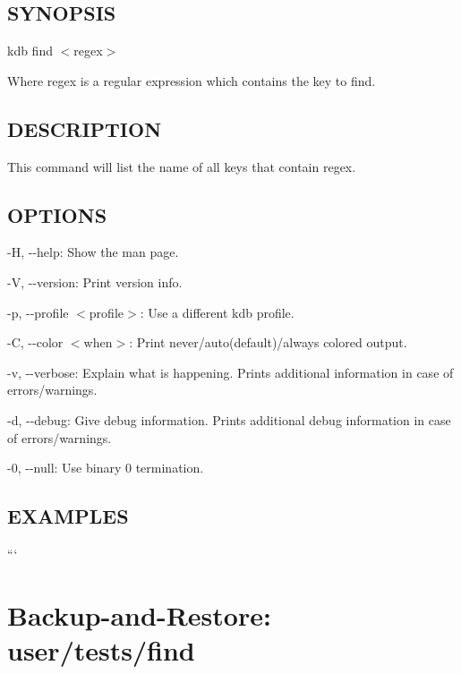 \subsection*{S\+Y\+N\+O\+P\+S\+IS}

{\ttfamily kdb find $<$regex$>$}

Where {\ttfamily regex} is a regular expression which contains the key to find.

\subsection*{D\+E\+S\+C\+R\+I\+P\+T\+I\+ON}

This command will list the name of all keys that contain {\ttfamily regex}.

\subsection*{O\+P\+T\+I\+O\+NS}


\begin{DoxyItemize}
\item {\ttfamily -\/H}, {\ttfamily -\/-\/help}\+: Show the man page.
\item {\ttfamily -\/V}, {\ttfamily -\/-\/version}\+: Print version info.
\item {\ttfamily -\/p}, {\ttfamily -\/-\/profile $<$profile$>$}\+: Use a different kdb profile.
\item {\ttfamily -\/C}, {\ttfamily -\/-\/color $<$when$>$}\+: Print never/auto(default)/always colored output.
\item {\ttfamily -\/v}, {\ttfamily -\/-\/verbose}\+: Explain what is happening. Prints additional information in case of errors/warnings.
\item {\ttfamily -\/d}, {\ttfamily -\/-\/debug}\+: Give debug information. Prints additional debug information in case of errors/warnings.
\item {\ttfamily -\/0}, {\ttfamily -\/-\/null}\+: Use binary 0 termination.
\end{DoxyItemize}

\subsection*{E\+X\+A\+M\+P\+L\+ES}

``` \section*{Backup-\/and-\/\+Restore\+: user/tests/find}

